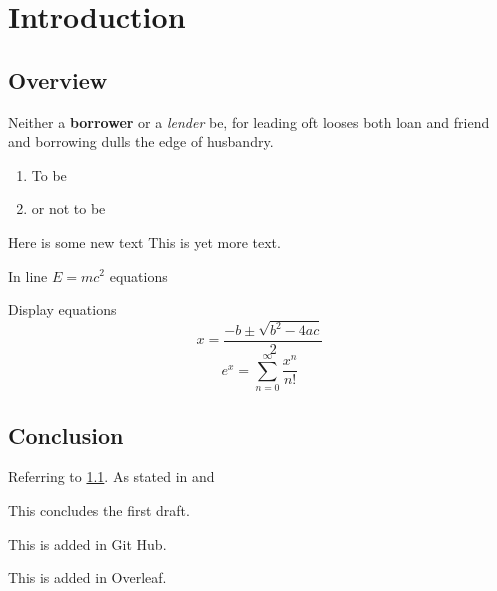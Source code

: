 \chapter{Introduction}

\section{Overview}
\label{Sec:Overview}

Neither a \textbf{borrower} or a \textit{lender} be, for leading oft looses both loan and friend and borrowing dulls the edge of husbandry.
\begin{enumerate}
\item To be
\item or not to be

\end{enumerate}

Here is some new text This is yet more text.

In line $E=mc^2$ equations

Display equations
\[
x=\frac{-b\pm\sqrt{b^2-4ac}}{2}
\]
\[
e^x = \sum_{n=0}^\infty\frac{x^n}{n!}
\]
\section{Conclusion}

Referring to \ref{Sec:Overview}. As stated in \cite[Section 2]{Bunce1992TheAlgebra} and \cite{Kaup1977AlgebraicBanachmanifolds}

This concludes the first draft.

This is added in Git Hub.

This is added in Overleaf.
